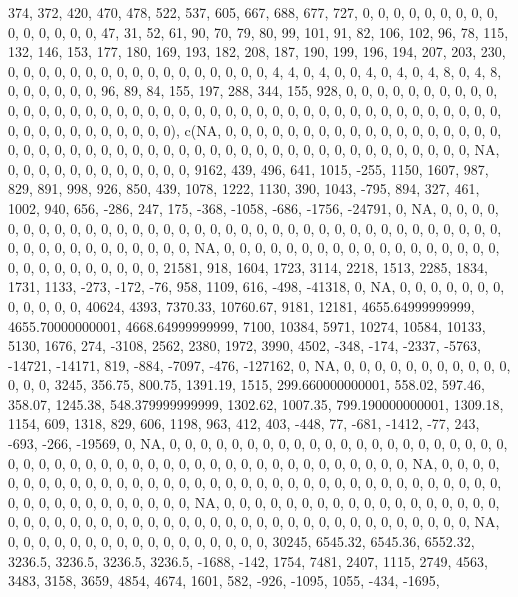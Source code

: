 \documentclass[
]{article}
\begin{document}
374, 372, 420, 470, 478, 522, 537, 605, 667, 688, 677, 727, 0, 0, 0, 0,
0, 0, 0, 0, 0, 0, 0, 0, 0, 0, 0, 47, 31, 52, 61, 90, 70, 79, 80, 99,
101, 91, 82, 106, 102, 96, 78, 115, 132, 146, 153, 177, 180, 169, 193,
182, 208, 187, 190, 199, 196, 194, 207, 203, 230, 0, 0, 0, 0, 0, 0, 0,
0, 0, 0, 0, 0, 0, 0, 0, 0, 0, 4, 4, 0, 4, 0, 0, 4, 0, 4, 0, 4, 8, 0, 4,
8, 0, 0, 0, 0, 0, 0, 96, 89, 84, 155, 197, 288, 344, 155, 928, 0, 0, 0,
0, 0, 0, 0, 0, 0, 0, 0, 0, 0, 0, 0, 0, 0, 0, 0, 0, 0, 0, 0, 0, 0, 0, 0,
0, 0, 0, 0, 0, 0, 0, 0, 0, 0, 0, 0, 0, 0, 0, 0, 0, 0, 0, 0, 0, 0, 0, 0,
0, 0), c(NA, 0, 0, 0, 0, 0, 0, 0, 0, 0, 0, 0, 0, 0, 0, 0, 0, 0, 0, 0, 0,
0, 0, 0, 0, 0, 0, 0, 0, 0, 0, 0, 0, 0, 0, 0, 0, 0, 0, 0, 0, 0, 0, 0, 0,
0, 0, 0, 0, NA, 0, 0, 0, 0, 0, 0, 0, 0, 0, 0, 0, 0, 9162, 439, 496, 641,
1015, -255, 1150, 1607, 987, 829, 891, 998, 926, 850, 439, 1078, 1222,
1130, 390, 1043, -795, 894, 327, 461, 1002, 940, 656, -286, 247, 175,
-368, -1058, -686, -1756, -24791, 0, NA, 0, 0, 0, 0, 0, 0, 0, 0, 0, 0,
0, 0, 0, 0, 0, 0, 0, 0, 0, 0, 0, 0, 0, 0, 0, 0, 0, 0, 0, 0, 0, 0, 0, 0,
0, 0, 0, 0, 0, 0, 0, 0, 0, 0, 0, 0, 0, 0, NA, 0, 0, 0, 0, 0, 0, 0, 0, 0,
0, 0, 0, 0, 0, 0, 0, 0, 0, 0, 0, 0, 0, 0, 0, 0, 0, 0, 0, 21581, 918,
1604, 1723, 3114, 2218, 1513, 2285, 1834, 1731, 1133, -273, -172, -76,
958, 1109, 616, -498, -41318, 0, NA, 0, 0, 0, 0, 0, 0, 0, 0, 0, 0, 0, 0,
40624, 4393, 7370.33, 10760.67, 9181, 12181, 4655.64999999999,
4655.70000000001, 4668.64999999999, 7100, 10384, 5971, 10274, 10584,
10133, 5130, 1676, 274, -3108, 2562, 2380, 1972, 3990, 4502, -348, -174,
-2337, -5763, -14721, -14171, 819, -884, -7097, -476, -127162, 0, NA, 0,
0, 0, 0, 0, 0, 0, 0, 0, 0, 0, 0, 0, 0, 3245, 356.75, 800.75, 1391.19,
1515, 299.660000000001, 558.02, 597.46, 358.07, 1245.38,
548.379999999999, 1302.62, 1007.35, 799.190000000001, 1309.18, 1154,
609, 1318, 829, 606, 1198, 963, 412, 403, -448, 77, -681, -1412, -77,
243, -693, -266, -19569, 0, NA, 0, 0, 0, 0, 0, 0, 0, 0, 0, 0, 0, 0, 0,
0, 0, 0, 0, 0, 0, 0, 0, 0, 0, 0, 0, 0, 0, 0, 0, 0, 0, 0, 0, 0, 0, 0, 0,
0, 0, 0, 0, 0, 0, 0, 0, 0, 0, 0, NA, 0, 0, 0, 0, 0, 0, 0, 0, 0, 0, 0, 0,
0, 0, 0, 0, 0, 0, 0, 0, 0, 0, 0, 0, 0, 0, 0, 0, 0, 0, 0, 0, 0, 0, 0, 0,
0, 0, 0, 0, 0, 0, 0, 0, 0, 0, 0, 0, NA, 0, 0, 0, 0, 0, 0, 0, 0, 0, 0, 0,
0, 0, 0, 0, 0, 0, 0, 0, 0, 0, 0, 0, 0, 0, 0, 0, 0, 0, 0, 0, 0, 0, 0, 0,
0, 0, 0, 0, 0, 0, 0, 0, 0, 0, 0, 0, 0, NA, 0, 0, 0, 0, 0, 0, 0, 0, 0, 0,
0, 0, 0, 0, 0, 0, 0, 30245, 6545.32, 6545.36, 6552.32, 3236.5, 3236.5,
3236.5, 3236.5, -1688, -142, 1754, 7481, 2407, 1115, 2749, 4563, 3483,
3158, 3659, 4854, 4674, 1601, 582, -926, -1095, 1055, -434, -1695,
\end{document}
